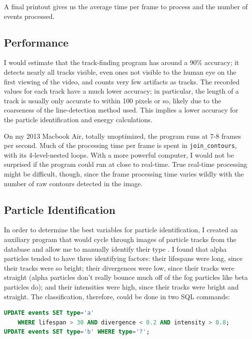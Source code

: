 \documentclass[notitlepage,12pt]{article}
\newcommand{\mycite}[1]{\cite{#1}}
\begin{document}
A final printout gives us the average time per frame to process and the number of events processed.

\subsection{Performance}

I would estimate that the track-finding program has around a 90\% accuracy; it detects nearly all tracks visible, even ones not visible to the human eye on the first viewing of the video, and counts very few artifacts as tracks.  The recorded values for each track have a much lower accuracy; in particular, the length of a track is usually only accurate to within 100 pixels or so, likely due to the coarseness of the line-detection method used.  This implies a lower accuracy for the particle identification and energy calculations.

On my 2013 Macbook Air, totally unoptimized, the program runs at 7-8 frames per second.  Much of the processing time per frame is spent in \texttt{join\_contours}, with its 4-level-nested loops.  With a more powerful computer, I would not be surprised if the program could run at close to real-time.  True real-time processing might be difficult, though, since the frame processing time varies wildly with the number of raw contours detected in the image.

\subsection{Particle Identification}

In order to determine the best variables for particle identification, I created an auxiliary program that would cycle through images of particle tracks from the database and allow me to manually identify their type \mycite{wayne}.  I found that alpha particles tended to have three identifying factors: their lifespans were long, since their tracks were so bright; their divergences were low, since their tracks were straight (alpha particles don't really bounce much off of the fog particles like beta particles do); and their intensities were high, since their tracks were bright and straight.  The classification, therefore, could be done in two SQL commands:
\begin{lstlisting}[language=SQL]
UPDATE events SET type='a' 
    WHERE lifespan > 30 AND divergence < 0.2 AND intensity > 0.8;
UPDATE events SET type='b' WHERE type='?';
\end{lstlisting}
\end{document}
